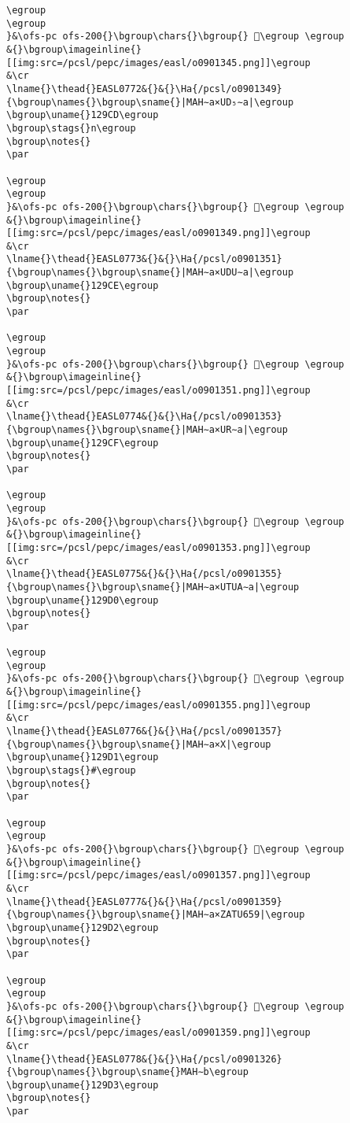 \begin{verbatim}
\egroup
\egroup
}&\ofs-pc ofs-200{}\bgroup\chars{}\bgroup{} 𒧌\egroup \egroup
&{}\bgroup\imageinline{}[[img:src=/pcsl/pepc/images/easl/o0901345.png]]\egroup
&\cr
\lname{}\thead{}EASL0772&{}&{}\Ha{/pcsl/o0901349}{\bgroup\names{}\bgroup\sname{}|MAH∼a×UD₅∼a|\egroup
\bgroup\uname{}129CD\egroup
\bgroup\stags{}n\egroup
\bgroup\notes{}
\par 

\egroup
\egroup
}&\ofs-pc ofs-200{}\bgroup\chars{}\bgroup{} 𒧍\egroup \egroup
&{}\bgroup\imageinline{}[[img:src=/pcsl/pepc/images/easl/o0901349.png]]\egroup
&\cr
\lname{}\thead{}EASL0773&{}&{}\Ha{/pcsl/o0901351}{\bgroup\names{}\bgroup\sname{}|MAH∼a×UDU∼a|\egroup
\bgroup\uname{}129CE\egroup
\bgroup\notes{}
\par 

\egroup
\egroup
}&\ofs-pc ofs-200{}\bgroup\chars{}\bgroup{} 𒧎\egroup \egroup
&{}\bgroup\imageinline{}[[img:src=/pcsl/pepc/images/easl/o0901351.png]]\egroup
&\cr
\lname{}\thead{}EASL0774&{}&{}\Ha{/pcsl/o0901353}{\bgroup\names{}\bgroup\sname{}|MAH∼a×UR∼a|\egroup
\bgroup\uname{}129CF\egroup
\bgroup\notes{}
\par 

\egroup
\egroup
}&\ofs-pc ofs-200{}\bgroup\chars{}\bgroup{} 𒧏\egroup \egroup
&{}\bgroup\imageinline{}[[img:src=/pcsl/pepc/images/easl/o0901353.png]]\egroup
&\cr
\lname{}\thead{}EASL0775&{}&{}\Ha{/pcsl/o0901355}{\bgroup\names{}\bgroup\sname{}|MAH∼a×UTUA∼a|\egroup
\bgroup\uname{}129D0\egroup
\bgroup\notes{}
\par 

\egroup
\egroup
}&\ofs-pc ofs-200{}\bgroup\chars{}\bgroup{} 𒧐\egroup \egroup
&{}\bgroup\imageinline{}[[img:src=/pcsl/pepc/images/easl/o0901355.png]]\egroup
&\cr
\lname{}\thead{}EASL0776&{}&{}\Ha{/pcsl/o0901357}{\bgroup\names{}\bgroup\sname{}|MAH∼a×X|\egroup
\bgroup\uname{}129D1\egroup
\bgroup\stags{}#\egroup
\bgroup\notes{}
\par 

\egroup
\egroup
}&\ofs-pc ofs-200{}\bgroup\chars{}\bgroup{} 𒧑\egroup \egroup
&{}\bgroup\imageinline{}[[img:src=/pcsl/pepc/images/easl/o0901357.png]]\egroup
&\cr
\lname{}\thead{}EASL0777&{}&{}\Ha{/pcsl/o0901359}{\bgroup\names{}\bgroup\sname{}|MAH∼a×ZATU659|\egroup
\bgroup\uname{}129D2\egroup
\bgroup\notes{}
\par 

\egroup
\egroup
}&\ofs-pc ofs-200{}\bgroup\chars{}\bgroup{} 𒧒\egroup \egroup
&{}\bgroup\imageinline{}[[img:src=/pcsl/pepc/images/easl/o0901359.png]]\egroup
&\cr
\lname{}\thead{}EASL0778&{}&{}\Ha{/pcsl/o0901326}{\bgroup\names{}\bgroup\sname{}MAH∼b\egroup
\bgroup\uname{}129D3\egroup
\bgroup\notes{}
\par 


\end{verbatim}
